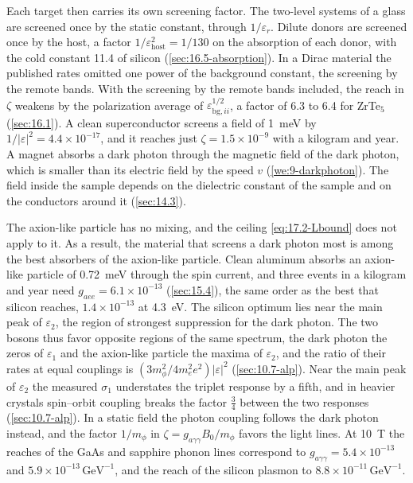 Each target then carries its own screening factor. The two-level systems of a glass are screened once by the static constant, through $1/\varepsilon_r$. Dilute donors are screened once by the host, a factor $1/\varepsilon_{\mathrm{host}}^2 = 1/130$ on the absorption of each donor, with the cold constant 11.4 of silicon (\cref{sec:16.5-absorption}). In a Dirac material the published rates omitted one power of the background constant, the screening by the remote bands. With the screening by the remote bands included, the reach in $\zeta$ weakens by the polarization average of $\varepsilon_{\mathrm{bg},ii}^{1/2}$, a factor of 6.3 to 6.4 for ZrTe$_5$ (\cref{sec:16.1}). A clean superconductor screens a field of \SI{1}{meV} by $1/|\varepsilon|^2 = 4.4\times10^{-17}$, and it reaches just $\zeta = 1.5\times10^{-9}$ with a kilogram and year. A magnet absorbs a dark photon through the magnetic field of the dark photon, which is smaller than its electric field by the speed $v$ (\cref{we:9-darkphoton}). The field inside the sample depends on the dielectric constant of the sample and on the conductors around it (\cref{sec:14.3}).

The axion-like particle has no mixing, and the ceiling \cref{eq:17.2-Lbound} does not apply to it. As a result, the material that screens a dark photon most is among the best absorbers of the axion-like particle. Clean aluminum absorbs an axion-like particle of \SI{0.72}{meV} through the spin current, and three events in a kilogram and year need $g_{aee} = 6.1\times10^{-13}$ (\cref{sec:15.4}), the same order as the best that silicon reaches, $1.4\times10^{-13}$ at \SI{4.3}{eV}. The silicon optimum lies near the main peak of $\varepsilon_2$, the region of strongest suppression for the dark photon. The two bosons thus favor opposite regions of the same spectrum, the dark photon the zeros of $\varepsilon_1$ and the axion-like particle the maxima of $\varepsilon_2$, and the ratio of their rates at equal couplings is $(3m_\phi^2/4m_e^2e^2)|\varepsilon|^2$ (\cref{sec:10.7-alp}). Near the main peak of $\varepsilon_2$ the measured $\sigma_1$ understates the triplet response by a fifth, and in heavier crystals spin--orbit coupling breaks the factor $\frac34$ between the two responses (\cref{sec:10.7-alp}). In a static field the photon coupling follows the dark photon instead, and the factor $1/m_\phi$ in $\zeta = g_{a\gamma\gamma}B_0/m_\phi$ favors the light lines. At \SI{10}{T} the reaches of the GaAs and sapphire phonon lines correspond to $g_{a\gamma\gamma} = 5.4\times10^{-13}$ and $5.9\times10^{-13}\,\mathrm{GeV^{-1}}$, and the reach of the silicon plasmon to $8.8\times10^{-11}\,\mathrm{GeV^{-1}}$.

